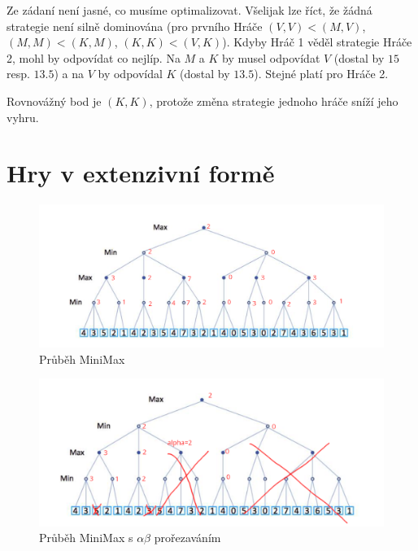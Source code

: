 \documentclass{article}
\begin{document}
Ze zádaní není jasné, co musíme optimalizovat. Všelijak lze říct, že žádná strategie není silně dominována (pro prvního Hráče ${(V,V)<(M, V)}$, ${(M,M)<(K,M)}$, ${(K,K)<(V,K)}$). Kdyby Hráč 1 věděl strategie Hráče 2, mohl by odpovídat co nejlíp. Na $M$ a $K$ by musel odpovídat $V$ (dostal by $15$ resp. $13.5$) a na $V$ by odpovídal $K$ (dostal by $13.5$). Stejné platí pro Hráče 2.

Rovnovážný bod je $(K, K)$, protože změna strategie jednoho hráče sníží jeho vyhru.

\section{Hry v extenzivní formě}

\begin{figure}[h!]
    \centering
    \includegraphics[scale=1.5]{zum-3-1.png}
    \caption{Průběh MiniMax}
    \label{fig:enter-label}
\end{figure}

\begin{figure}[h!]
    \centering
    \includegraphics[scale=1.5]{zum-3-2.png}
    \caption{Průběh MiniMax s $\alpha\beta$ prořezaváním}
    \label{fig:enter-label}
\end{figure}
\end{document}
